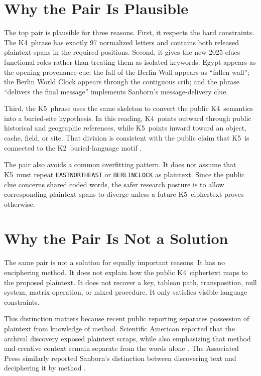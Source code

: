 \documentclass[12pt]{paperFormatting}
\newcommand{\Kfour}{K4}
\newcommand{\Kfive}{K5}
\newcommand{\Ktwo}{K2}
\begin{document}
\begin{thesisbody}
\section{Why the Pair Is Plausible}
The top pair is plausible for three reasons. First, it respects the hard constraints. The \Kfour\ phrase has exactly 97 normalized letters and contains both released plaintext spans in the required positions. Second, it gives the new 2025 clues functional roles rather than treating them as isolated keywords. Egypt appears as the opening provenance cue; the fall of the Berlin Wall appears as ``fallen wall''; the Berlin World Clock appears through the contiguous crib; and the phrase ``delivers the final message'' implements Sanborn's message-delivery clue.

Third, the \Kfive\ phrase uses the same skeleton to convert the public \Kfour\ semantics into a buried-site hypothesis. In this reading, \Kfour\ points outward through public historical and geographic references, while \Kfive\ points inward toward an object, cache, field, or site. That division is consistent with the public claim that \Kfive\ is connected to the \Ktwo\ buried-language motif \cite{verganoFinalClues2025}.

The pair also avoids a common overfitting pattern. It does not assume that \Kfive\ must repeat \texttt{EASTNORTHEAST} or \texttt{BERLINCLOCK} as plaintext. Since the public clue concerns shared coded words, the safer research posture is to allow corresponding plaintext spans to diverge unless a future \Kfive\ ciphertext proves otherwise.

\section{Why the Pair Is Not a Solution}
The same pair is not a solution for equally important reasons. It has no enciphering method. It does not explain how the public \Kfour\ ciphertext maps to the proposed plaintext. It does not recover a key, tableau path, transposition, null system, matrix operation, or mixed procedure. It only satisfies visible language constraints.

This distinction matters because recent public reporting separates possession of plaintext from knowledge of method. Scientific American reported that the archival discovery exposed plaintext scraps, while also emphasizing that method and creative context remain separate from the words alone \cite{basilioKryptosSolution2025}. The Associated Press similarly reported Sanborn's distinction between discovering text and deciphering it by method \cite{caseyAP2025}.


\end{thesisbody}
\end{document}
